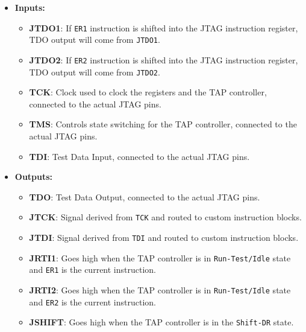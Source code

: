 \documentclass[a4paper,11pt,oneside]{report}
\begin{document}
\begin{itemize}
    \item \textbf{Inputs:}
    \begin{itemize}
        \item \textbf{JTDO1}: If \texttt{ER1} instruction is shifted into the JTAG instruction register, 
        TDO output will come from \texttt{JTDO1}.
        
        \item \textbf{JTDO2}: If \texttt{ER2} instruction is shifted into the JTAG instruction register, 
        TDO output will come from \texttt{JTDO2}.
        
        \item \textbf{TCK}: Clock used to clock the registers and the TAP controller, connected to the actual JTAG pins.
        
        \item \textbf{TMS}: Controls state switching for the TAP controller, connected to the actual JTAG pins.
        
        \item \textbf{TDI}: Test Data Input, connected to the actual JTAG pins.
    \end{itemize}

    \item \textbf{Outputs:}
    \begin{itemize}
        \item \textbf{TDO}: Test Data Output, connected to the actual JTAG pins.
        
        \item \textbf{JTCK}: Signal derived from \texttt{TCK} and routed to custom instruction blocks.
        
        \item \textbf{JTDI}: Signal derived from \texttt{TDI} and routed to custom instruction blocks.
        
        \item \textbf{JRTI1}: Goes high when the TAP controller is in \texttt{Run-Test/Idle} state 
        and \texttt{ER1} is the current instruction.
        
        \item \textbf{JRTI2}: Goes high when the TAP controller is in \texttt{Run-Test/Idle} state 
        and \texttt{ER2} is the current instruction.
        
        \item \textbf{JSHIFT}: Goes high when the TAP controller is in the \texttt{Shift-DR} state.
        

\end{itemize}
\end{itemize}
\end{document}
